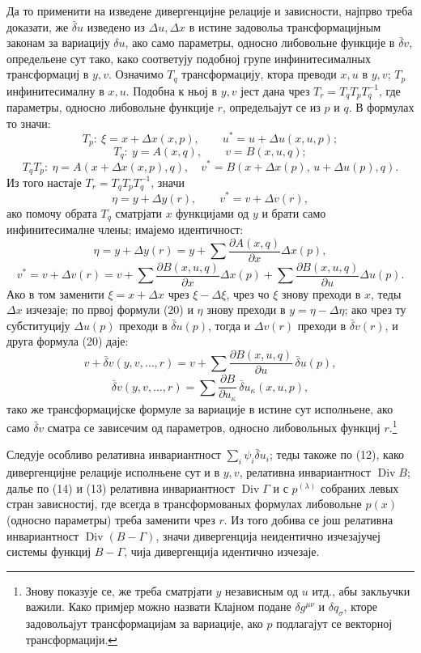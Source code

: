 ﻿\documentclass[11pt]{article}
\providecommand{\D}{\Delta}
\providecommand{\p}{\partial}
\DeclareMathOperator{\Div}{Div}
\providecommand{\bd}{\bar{\delta}}
\begin{document}
Да то применити на изведене дивергенцијне релације и зависности, најпрво треба доказати, же \(\bd u\) изведено из \(\D u,\D x\) в истине задовольа трансформацијным законам за вариацију \(\delta u\), ако само параметры, односно либовольне функције в \(\bd v\), определьене сут тако, како соответују подобној групе инфинитесималных трансформациј в \(y,v\). Означимо \(T_q\) трансформацију, ктора преводи \(x,u\) в \(y,v\); \(T_p\) инфинитесималну в \(x,u\). Подобна к ньој в \(y,v\) јест дана чрез \(T_r=T_qT_pT_q^{-1}\), где параметры, односно либовольне функције \(r\), определьајут се из \(p\) и \(q\). В формулах то значи:
\[
T_p:\ \xi=x+\D x(x,p),\qquad u^*=u+\D u(x,u,p);
\]
\[
T_q:\ y=A(x,q),\qquad v=B(x,u,q);
\]
\[
T_qT_p:\ \eta=A(x+\D x(x,p),q),\quad
v^*=B(x+\D x(p),\,u+\D u(p),q).
\]
Из того настаје \(T_r=T_qT_pT_q^{-1}\), значи
\[
\eta=y+\D y(r),\qquad v^*=v+\D v(r),
\]
ако помочу обрата \(T_q\) сматрјати \(x\) функцијами од \(y\) и брати само инфинитесималне члены; имајемо идентичност:
\begin{equation}
\eta=y+\D y(r)=y+\sum\frac{\p A(x,q)}{\p x}\D x(p),
\tag{20a}
\end{equation}
\begin{equation}
v^*=v+\D v(r)=v+\sum\frac{\p B(x,u,q)}{\p x}\D x(p)
+\sum\frac{\p B(x,u,q)}{\p u}\D u(p).
\tag{20b}
\end{equation}
Ако в том заменити \(\xi=x+\D x\) чрез \(\xi-\D \xi\), чрез чо \(\xi\) знову преходи в \(x\), теды \(\D x\) изчезаје; по првој формули (20) и \(\eta\) знову преходи в \(y=\eta-\D\eta\); ако чрез ту субституцију \(\D u(p)\) преходи в \(\bd u(p)\), тогда и \(\D v(r)\) преходи в \(\bd v(r)\), и друга формула (20) даје:
\[
v+\bd v(y,v,\ldots,r)=v+\sum\frac{\p B(x,u,q)}{\p u}\,\bd u(p),
\]
\[
\bd v(y,v,\ldots,r)=\sum\frac{\p B}{\p u_\kappa}\,\bd u_\kappa(x,u,p),
\]
тако же трансформацијске формуле за вариације в истине сут исполньене, ако само \(\bd v\) сматра се зависечим од параметров, односно либовольных функциј \(r\).\footnote{Знову показује се, же треба сматрјати \(y\) независным од \(u\) итд., абы закльучки важили. Како примјер можно назвати Клајном подане \(\delta g^{\mu\nu}\) и \(\delta q_\sigma\), кторе задовольајут трансформацијам за вариације, ако \(p\) подлагајут се векторној трансформацији.}

Следује особливо релативна инвариантност \(\sum_i\psi_i\bd u_i\); теды такоже по (12), како дивергенцијне релације исполньене сут и в \(y,v\), релативна инвариантност \(\Div B\); далье по (14) и (13) релативна инвариантност \(\Div\Gamma\) и с \(p^{(\lambda)}\) собраних левых стран зависностиј, где всегда в трансформованых формулах либовольне \(p(x)\) (односно параметры) треба заменити чрез \(r\). Из того добива се још релативна инвариантност \(\Div(B-\Gamma)\), значи дивергенција неидентично изчезајучеј системы функциј \(B-\Gamma\), чија дивергенција идентично изчезаје.
\end{document}

